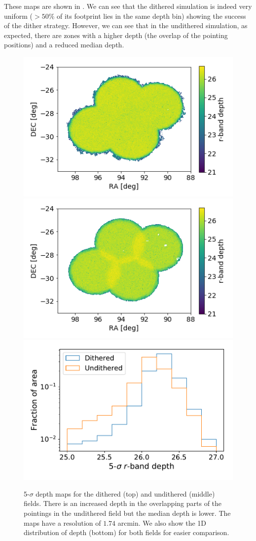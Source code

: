 \documentclass[\docopts]{\docclass}
\begin{document}
These maps are shown in . We can see that the dithered simulation is indeed very uniform ($> 50\%$ of its footprint lies in the same depth bin) showing the success of the dither strategy. However, we can see that in the undithered simulation, as expected, there are zones with a higher depth (the overlap of the pointing positions) and a reduced median depth.
\begin{figure}
\centering
\includegraphics[width=0.85\columnwidth]{dithered_depth.png}
\includegraphics[width=0.85\columnwidth]{undithered_depth.png}
\includegraphics[width=0.85\columnwidth]{depth_comparison_1d.pdf}
\caption{5-$\sigma$ depth maps for the dithered (top) and undithered (middle) fields. There is an increased depth in the overlapping parts of the pointings in the undithered field but the median depth is lower. The maps have a resolution of $1.74$ arcmin. We also show the 1D distribution of depth (bottom) for both fields for easier comparison.}
\label{fig:depth_maps}
\end{figure}
\end{document}
